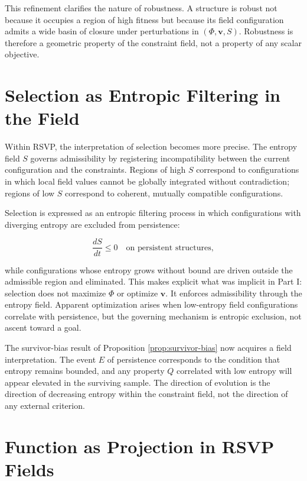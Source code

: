 \documentclass[12pt, a4paper, oneside]{article}
\theoremstyle{plain}
\theoremstyle{definition}
\theoremstyle{remark}
\begin{document}
This refinement clarifies the nature of robustness. A structure is robust not because it occupies a region of high fitness but because its field configuration admits a wide basin of closure under perturbations in $(\Phi, \mathbf{v}, S)$. Robustness is therefore a geometric property of the constraint field, not a property of any scalar objective.

\section{Selection as Entropic Filtering in the Field}

Within RSVP, the interpretation of selection becomes more precise. The entropy field $S$ governs admissibility by registering incompatibility between the current configuration and the constraints. Regions of high $S$ correspond to configurations in which local field values cannot be globally integrated without contradiction; regions of low $S$ correspond to coherent, mutually compatible configurations.

Selection is expressed as an entropic filtering process in which configurations with diverging entropy are excluded from persistence:

\begin{equation}
\frac{dS}{dt} \leq 0 \quad \text{on persistent structures},
\end{equation}

while configurations whose entropy grows without bound are driven outside the admissible region and eliminated. This makes explicit what was implicit in Part I: selection does not maximize $\Phi$ or optimize $\mathbf{v}$. It enforces admissibility through the entropy field. Apparent optimization arises when low-entropy field configurations correlate with persistence, but the governing mechanism is entropic exclusion, not ascent toward a goal.

The survivor-bias result of Proposition \ref{prop:survivor-bias} now acquires a field interpretation. The event $E$ of persistence corresponds to the condition that entropy remains bounded, and any property $Q$ correlated with low entropy will appear elevated in the surviving sample. The direction of evolution is the direction of decreasing entropy within the constraint field, not the direction of any external criterion.

\section{Function as Projection in RSVP Fields}
\end{document}
